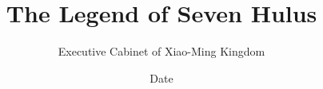 \documentclass[12pt, a4paper]{book}
\title{\textbf{The Legend of Seven Hulus}}
\author{Executive Cabinet of Xiao-Ming Kingdom}
\date{Date}
\begin{document}
\begin{CJK}{UTF8}{gbsn}

    \maketitle
    \clearpage
    \thispagestyle{empty}

    \frontmatter

    

    \tableofcontents

    \mainmatter

    
    

    \appendix


\end{CJK}
\end{document}
